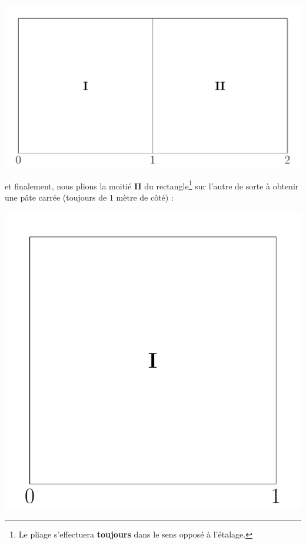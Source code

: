 \documentclass[a4paper,french,12pt]{article}
\begin{document}
\vspace*{-0.5cm}

\begin{center}
\includegraphics[scale=0.275]{../TeXGraph/Pdf/intro_pate_2.pdf}
\end{center}
et finalement, nous plions la moitié \textbf{II} du rectangle\footnote{Le pliage s'effectuera \textbf{toujours} dans le sens opposé à l'étalage.} sur l'autre de sorte à obtenir une pâte carrée (toujours de $1$ mètre de côté) :

\vspace*{-0.5cm}

\begin{center}
\includegraphics[scale=0.275]{../TeXGraph/Pdf/intro_pate_1.pdf}
\end{center}
\end{document}
